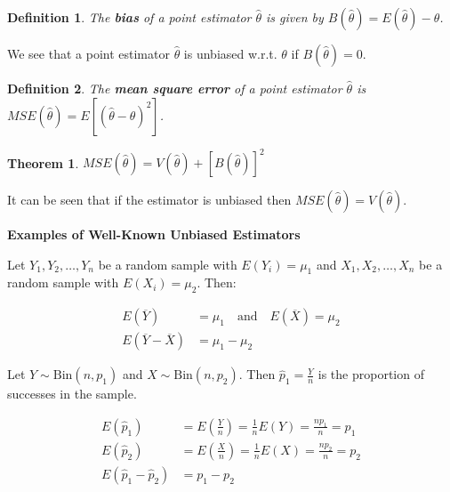 \documentclass[a4paper,12pt]{article}
\theoremstyle{nonitalic}
\newtheorem{definition}{Definition}[subsection]
\newtheorem{theorem}{Theorem}[subsection]
\begin{document}
    \bigskip

    \begin{definition}
        The \textbf{bias} of a point estimator $\hat{\theta}$ is given by $B(\hat{\theta}) = E(\hat{\theta}) - \theta$.
    \end{definition}
    We see that a point estimator $\hat{\theta}$ is unbiased w.r.t. $\theta$ if $B(\hat{\theta}) = 0$.

    \bigskip
        
    \begin{definition}
        The \textbf{mean square error} of a point estimator $\hat{\theta}$ is $MSE(\hat{\theta}) = E\left[ (\hat{\theta} - \theta)^2 \right]$.
    \end{definition}

    \begin{theorem}
        $MSE(\hat{\theta}) = V(\hat{\theta}) + \left[B(\hat{\theta})\right]^2$
    \end{theorem}
    It can be seen that if the estimator is unbiased then $MSE(\hat{\theta}) = V(\hat{\theta})$.

    \bigskip

    \textbf{Examples of Well-Known Unbiased Estimators}

    Let $Y_1, Y_2, \ldots, Y_n$ be a random sample with $E(Y_i) = \mu_1$ and $X_1, X_2, \ldots, X_n$ be a random sample with $E(X_i) = \mu_2$. Then:

    \begin{align*}
        E\left(\overline{Y}\right) &= \mu_1 \quad \text{and} \quad E\left(\overline{X}\right) = \mu_2\\
        E\left(\overline{Y} - \overline{X}\right) &= \mu_1 - \mu_2
    \end{align*}
    
    Let $Y \sim \text{Bin}(n, p_1)$ and $X \sim \text{Bin}(n, p_2)$. Then $\hat{p}_1 = \frac{Y}{n}$ is the proportion of successes in the sample.
    
    \begin{align*}
        E\left(\hat{p}_1\right) &= E\left(\frac{Y}{n}\right) = \frac{1}{n} E(Y) = \frac{np_1}{n} = p_1\\
        E\left(\hat{p}_2\right) &= E\left(\frac{X}{n}\right) = \frac{1}{n} E(X) = \frac{np_2}{n} = p_2\\
        E\left(\hat{p}_1 - \hat{p}_2\right) &= p_1 - p_2
    \end{align*}

    \newpage
\end{document}
